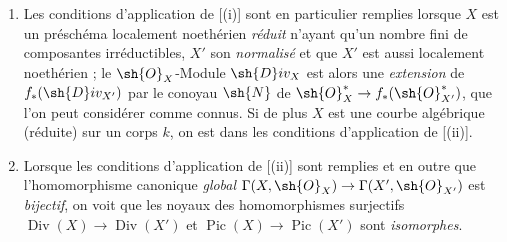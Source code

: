 \begin{remarks}[21.8.6]
\label{IV.21.8.6}
\begin{enumerate}[label=(\roman*)]
  \item Les conditions d'application de [(i)] sont en particulier remplies lorsque $X$ est un préschéma localement noethérien \emph{réduit} n'ayant qu'un nombre fini de composantes irréductibles, $X'$ son \emph{normalisé} et que $X'$ est aussi localement noethérien ;
le $\sh{O}_X$-Module $\sh{D}iv_X$ est alors une \emph{extension} de $f_*(\sh{D}iv_{X'})$ par le conoyau $\sh{N}$ de $\sh{O}^{*}_X\to f_*(\sh{O}^*_{X'})$, que l'on peut considérer comme connus.
Si de plus $X$ est une courbe algébrique (réduite) sur un corps $k$, on est dans les conditions d'application de [(ii)].

  \item Lorsque les conditions d'application de [(ii)] sont remplies et en outre que l'homomorphisme canonique \emph{global} $\Gamma(X,\sh{O}_X)\to\Gamma(X',\sh{O}_{X'})$ est \emph{bijectif}, on voit que les noyaux des homomorphismes surjectifs $\operatorname{Div}(X)\to\operatorname{Div}(X')$ et $\operatorname{Pic}(X)\to\operatorname{Pic}(X')$ sont \emph{isomorphes}.


\end{enumerate}
\end{remarks}
